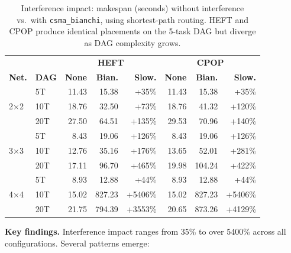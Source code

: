 \documentclass[conference]{IEEEtran}
\begin{document}
\begin{table}[t]
\centering
\caption{Interference impact: makespan (seconds) without interference vs.\
with \texttt{csma\_bianchi}, using shortest-path routing.  HEFT and CPOP
produce identical placements on the 5-task DAG but diverge as DAG
complexity grows.}
\label{tab:interference}
\setlength{\tabcolsep}{2.5pt}
\begin{tabular}{@{}ll|rrr|rrr@{}}
\toprule
& & \multicolumn{3}{c|}{\textbf{HEFT}} & \multicolumn{3}{c}{\textbf{CPOP}} \\
\textbf{Net.} & \textbf{DAG} &
  \textbf{None} & \textbf{Bian.} & \textbf{Slow.} &
  \textbf{None} & \textbf{Bian.} & \textbf{Slow.} \\
\midrule
\multirow{3}{*}{2$\times$2}
  & 5T  & 11.43 & 15.38 & +35\%   & 11.43 & 15.38 & +35\%   \\
  & 10T & 18.76 & 32.50 & +73\%   & 18.76 & 41.32 & +120\%  \\
  & 20T & 27.50 & 64.51 & +135\%  & 29.53 & 70.96 & +140\%  \\
\midrule
\multirow{3}{*}{3$\times$3}
  & 5T  & 8.43  & 19.06 & +126\%  & 8.43  & 19.06 & +126\%  \\
  & 10T & 12.76 & 35.16 & +176\%  & 13.65 & 52.01 & +281\%  \\
  & 20T & 17.11 & 96.70 & +465\%  & 19.98 & 104.24 & +422\% \\
\midrule
\multirow{3}{*}{4$\times$4}
  & 5T  & 8.93  & 12.88 & +44\%    & 8.93  & 12.88 & +44\%    \\
  & 10T & 15.02 & 827.23 & +5406\% & 15.02 & 827.23 & +5406\% \\
  & 20T & 21.75 & 794.39 & +3553\% & 20.65 & 873.26 & +4129\% \\
\bottomrule
\end{tabular}
\end{table}

\textbf{Key findings.}
Interference impact ranges from 35\% to over 5400\% across all
configurations.  Several patterns emerge:
\end{document}

